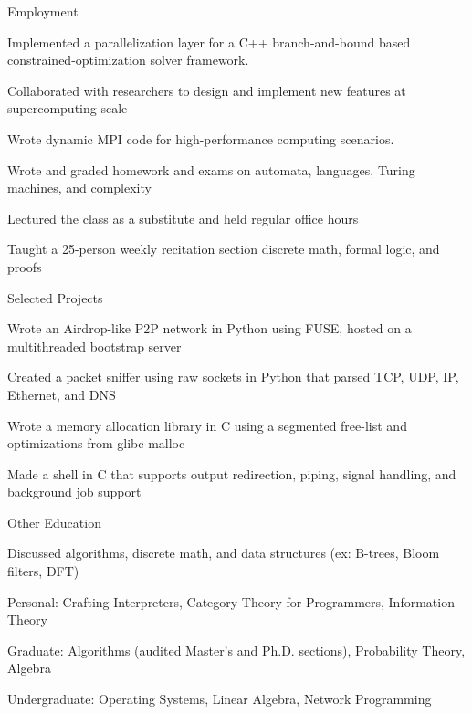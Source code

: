 \documentclass{cv}
\begin{document}
\begin{cvsection}{Employment}
{  }
  {
    \item Implemented a parallelization layer for a C++ branch-and-bound based constrained-optimization solver framework.
    \item Collaborated with researchers to design and implement new features at supercomputing scale
    \item Wrote dynamic MPI code for high-performance computing scenarios.
  }
  {
    \item Wrote and graded homework and exams on automata, languages, Turing machines, and complexity
    \item Lectured the class as a substitute and held regular office hours
  }
  {
    \item Taught a 25-person weekly recitation section discrete math, formal logic, and proofs
  }
\end{cvsection}

\begin{cvsection}{Selected Projects}
  {
    \item Wrote an Airdrop-like P2P network in Python using FUSE, hosted on a multithreaded bootstrap server
  }
  {
    \item Created a packet sniffer using raw sockets in Python that parsed TCP, UDP, IP, Ethernet, and DNS
  }
  {
    \item Wrote a memory allocation library in C using a segmented free-list and optimizations from glibc malloc
  }
  {
    \item Made a shell in C that supports output redirection, piping, signal handling, and background job support
  }
\end{cvsection}

\begin{cvsection}{Other Education}
  {
    \item Discussed algorithms, discrete math, and data structures (ex: B-trees, Bloom filters, DFT)
  }
  {
  \item Personal: Crafting Interpreters, Category Theory for Programmers, Information Theory
  \item Graduate: Algorithms (audited Master's and Ph.D. sections), Probability Theory, Algebra
  \item Undergraduate: Operating Systems, Linear Algebra, Network Programming
  }
\end{cvsection}
\end{document}
